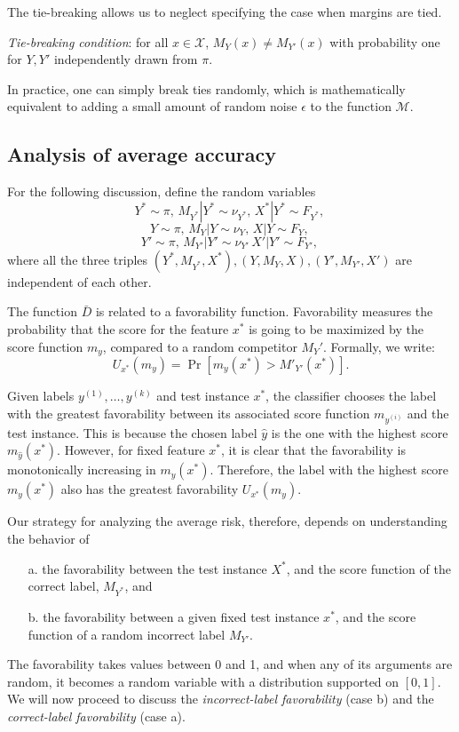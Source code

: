 \documentclass[12pt]{article}
\begin{document}
The tie-breaking allows us
to neglect specifying the case when
margins are tied.
\begin{definition}
\emph{Tie-breaking condition}: for all $x \in \mathcal{X}$,
$M_Y(x) \neq M_{Y'}(x)$
with probability one for $Y, Y'$ independently drawn from $\pi$.
\end{definition}
In practice, one can simply break ties randomly,
which is mathematically equivalent to adding a small amount of random
noise $\epsilon$ to the function $\mathcal{M}$.

\subsection{Analysis of average accuracy}

For the following discussion, define the random variables
\[Y^* \sim \pi,\, M_{Y^*}|Y^* \sim \nu_{Y^*},\, X^*|Y^* \sim F_{Y^*},\, \]
\[Y \sim \pi,\, M_{Y}|Y \sim \nu_{Y},\, X|Y \sim F_{Y},\, \]
\[Y' \sim \pi,\, M_{Y'}|Y' \sim \nu_{Y'}\, X'|Y' \sim F_{Y'},\, \]
where all the three triples $(Y^*, M_{Y^*}, X^*), (Y, M_{Y}, X), (Y', M_{Y'}, X')$ are independent of each other.

The function $\bar{D}$ is related to a favorability function. Favorability measures the probability that the score for 
the feature $x^*$ is going to be maximized by the score function $m_y$, compared to a random competitor $M_Y'$. 
Formally, we write:
\begin{equation}\label{eq:U_function}
U_{x^*}(m_{y}) = \Pr[m_{y}(x^*) > M'_{Y'}(x^*)].
\end{equation}

Given labels $y^{(1)},\hdots,y^{(k)}$ and test instance $x^*$,
the classifier chooses the label with the greatest favorability between its associated score function $m_{y^{(i)}}$ and the test instance.
This is because the chosen label $\hat{y}$ is the one with the highest score $m_{\hat{y}}(x^*).$  However, for fixed feature $x^*$, it is clear that the favorability is monotonically increasing in $m_{y}(x^*)$.  Therefore, the label with the highest score $m_y(x^*)$ also has the greatest favorability $U_{x^*}(m_y)$.

Our strategy for analyzing the average risk, therefore, depends on
understanding the behavior of
\begin{itemize}
\item[a.] the favorability between the test instance $X^*$, and the score function of the correct label, $M_{Y^*}$, and
\item[b.] the favorability between a given fixed test instance $x^*$, and the score function of a random incorrect label $M_{Y'}$.
\end{itemize}
The favorability takes values between 0 and 1, and when any of its arguments are random, it becomes a random variable with a distribution supported on $[0,1]$.
We will now proceed to discuss the \emph{incorrect-label favorability} (case b) and the \emph{correct-label favorability} (case a).
\end{document}
